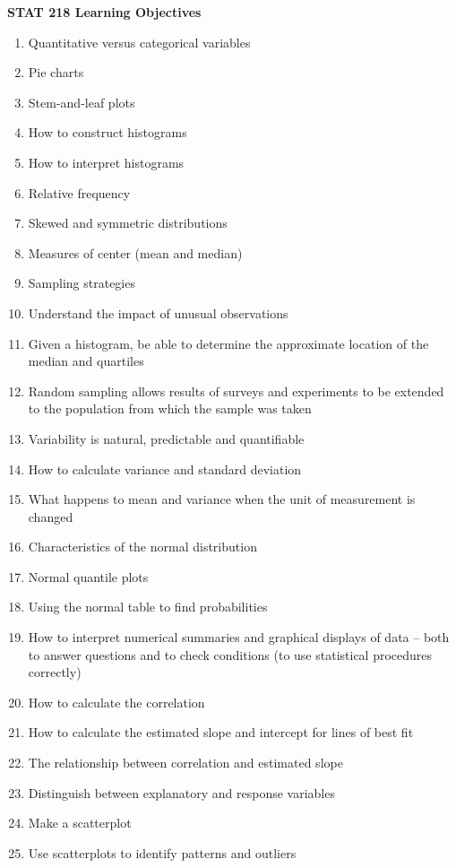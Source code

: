\documentclass{article}
\begin{document}
\begin{center}
{\large \textbf{STAT 218 Learning Objectives}}
\end{center}

\begin{enumerate}

\item Quantitative versus categorical variables
\item Pie charts
\item Stem-and-leaf plots
\item How to construct histograms
\item How to interpret histograms
\item Relative frequency
\item Skewed and symmetric distributions
\item Measures of center (mean and median)
\item Sampling strategies
\item Understand the impact of unusual observations
\item Given a histogram, be able to determine the approximate location of the median and quartiles
\item Random sampling allows results of surveys and experiments to be extended to the population from which the sample was taken
\item Variability is natural, predictable and quantifiable
\item How to calculate variance and standard deviation
\item What happens to mean and variance when the unit of measurement is changed
\item Characteristics of the normal distribution
\item Normal quantile plots
\item Using the normal table to find probabilities
\item How to interpret numerical summaries and graphical displays of data -- both to answer questions and to check conditions (to use statistical procedures correctly)
\item How to calculate the correlation
\item How to calculate the estimated slope and intercept for lines of best fit
\item The relationship between correlation and estimated slope
\item Distinguish between explanatory and response variables
\item Make a scatterplot
\item Use scatterplots to identify patterns and outliers

\end{enumerate}
\end{document}
